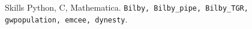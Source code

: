 
\begin{rubric}{Skills}
\entry*[Programming]
	Python, C, Mathematica.
	\texttt{Bilby, Bilby\_pipe, Bilby\_TGR, gwpopulation, emcee, dynesty}.    
\end{rubric}

